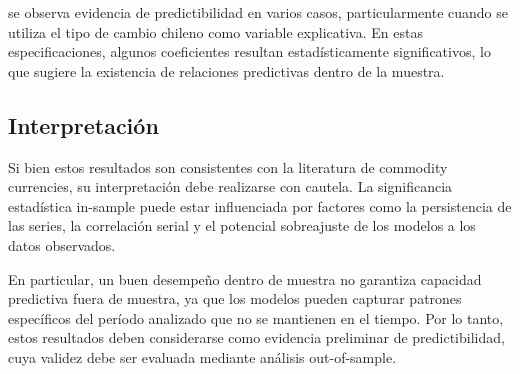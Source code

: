 \documentclass[11pt,a4paper]{article}
\begin{document}
\begin{table}[H]
	\centering
	\caption{Resultados Predictivos In-Sample con Errores HAC (Modelo F)}
	\label{tab:res_f}
	
	
\end{table}
		se observa evidencia de predictibilidad en varios casos, particularmente cuando se utiliza el tipo de cambio chileno como variable explicativa. En estas especificaciones, algunos coeficientes resultan estadísticamente significativos, lo que sugiere la existencia de relaciones predictivas dentro de la muestra.

	\subsection{Interpretación}
		Si bien estos resultados son consistentes con la literatura de commodity currencies, su interpretación debe realizarse con cautela. La significancia estadística in-sample puede estar influenciada por factores como la persistencia de las series, la correlación serial y el potencial sobreajuste de los modelos a los datos observados.
		
		En particular, un buen desempeño dentro de muestra no garantiza capacidad predictiva fuera de muestra, ya que los modelos pueden capturar patrones específicos del período analizado que no se mantienen en el tiempo. Por lo tanto, estos resultados deben considerarse como evidencia preliminar de predictibilidad, cuya validez debe ser evaluada mediante análisis out-of-sample.
\newpage
	
\end{document}
